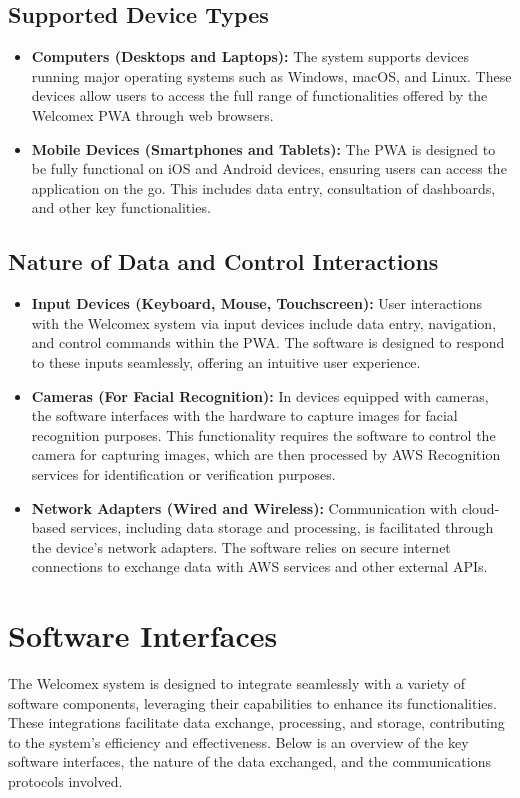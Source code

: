 \documentclass{scrreprt}
\begin{document}
\subsection*{Supported Device Types}
\begin{itemize}
    \item \textbf{Computers (Desktops and Laptops):} The system supports devices running major operating systems such as Windows, macOS, and Linux. These devices allow users to access the full range of functionalities offered by the Welcomex PWA through web browsers.
    \item \textbf{Mobile Devices (Smartphones and Tablets):} The PWA is designed to be fully functional on iOS and Android devices, ensuring users can access the application on the go. This includes data entry, consultation of dashboards, and other key functionalities.
\end{itemize}

\subsection*{Nature of Data and Control Interactions}
\begin{itemize}
    \item \textbf{Input Devices (Keyboard, Mouse, Touchscreen):} User interactions with the Welcomex system via input devices include data entry, navigation, and control commands within the PWA. The software is designed to respond to these inputs seamlessly, offering an intuitive user experience.
    \item \textbf{Cameras (For Facial Recognition):} In devices equipped with cameras, the software interfaces with the hardware to capture images for facial recognition purposes. This functionality requires the software to control the camera for capturing images, which are then processed by AWS Recognition services for identification or verification purposes.
    \item \textbf{Network Adapters (Wired and Wireless):} Communication with cloud-based services, including data storage and processing, is facilitated through the device's network adapters. The software relies on secure internet connections to exchange data with AWS services and other external APIs.
\end{itemize}

\section{Software Interfaces}
The Welcomex system is designed to integrate seamlessly with a variety of software components, leveraging their capabilities to enhance its functionalities. These integrations facilitate data exchange, processing, and storage, contributing to the system's efficiency and effectiveness. Below is an overview of the key software interfaces, the nature of the data exchanged, and the communications protocols involved.
\end{document}
